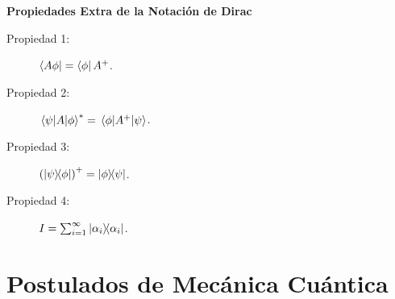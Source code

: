 \textbf{Propiedades Extra de la Notación de Dirac}

\begin{description}
	\item[Propiedad 1: ] $\bra{A\phi} = \bra{\phi} A^+$.
	\item[Propiedad 2: ] $\mel{\psi}{A}{\phi} ^* = \mel{\phi}{A^+}{\psi}$.
	\item[Propiedad 3: ] $\qty(\ketbra{\psi}{\phi})^+ = \ketbra{\phi}{\psi}$.
	\item[Propiedad 4: ] $I = \sum _{i=1} ^\infty \ketbra{\alpha _i}$.
\end{description}



\chapter{Postulados de Mecánica Cuántica}



































